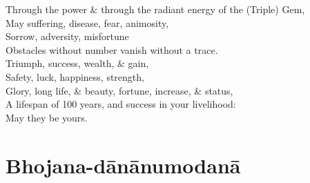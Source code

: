 \begin{english-verses}
  Through the power \& through the radiant energy of the (Triple) Gem,\\
  May suffering, disease, fear, animosity,\\
  Sorrow, adversity, misfortune\\
  Obstacles without number vanish without a trace.\\
  Triumph, success, wealth, \& gain,\\
  Safety, luck, happiness, strength,\\
  Glory, long life, \& beauty, fortune, increase, \& status,\\
  A lifespan of 100 years, and success in your livelihood:\\
  May they be yours.
\end{english-verses}

\suttaRef{[Thai]}

\section{Bhojana-dānānumodanā}
\label{bhojana-dananumodana}

 \vspace{-0.6em}


